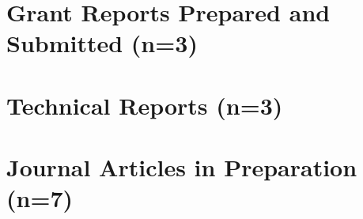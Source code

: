 \section{Grant Reports Prepared and Submitted (n=3)}
\begin{refsection}
\nocite{moore_progress_2020, moore_progress_2020-2, moore_progress_2020-1}
\printbibliography[heading=none]
\end{refsection}

\newpage

\section{Technical Reports (n=3)}
\begin{refsection}
\nocite{grasela_technical_2020, grasela_technical_2020-1, grasela_technical_2020-2}
\printbibliography[heading=none]
\end{refsection}


\section{Journal Articles in Preparation (n=7)}
\begin{refsection}
\nocite{moore_first_nodate-1,moore_mariana_2013,moore_three_nodate-1,moore_change_nodate,moore_aubrey_crb_nodate,marshall_recent_nodate,moore_coconut_nodate-1}
\printbibliography[heading=none]
\end{refsection}

\newpage
	
